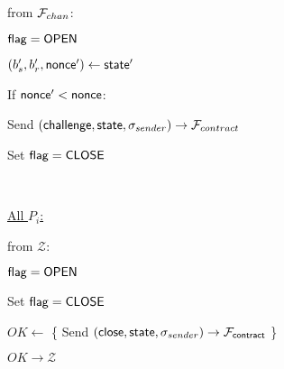 \begin{bbox}[title={$\Pi_{\msf{pay}} (P_s, P_r, b_s, b_r)$}]
\OnInput {} from $\mathcal{F}_{chan}$:
	\begin{renumerate}
		\item \Require ${\mathsf {flag}} = {\mathsf {OPEN}}$
		\item $(b_s', b_r', {\mathsf {nonce}}') \leftarrow {\mathsf {state}}'$
		\item If ${\mathsf {nonce}}' < {\mathsf {nonce}}$:

			\quad Send $({\mathsf {challenge}}, {\mathsf {state}}, \sigma_{sender}) \rightarrow \mathcal{F}_{contract}$

		\item Set ${\mathsf {flag}} = {\mathsf {CLOSE}}$
	\end{renumerate}

\

\underline{All $P_i$:}

\OnInput {} from $\mathcal{Z}$:
	\begin{renumerate}
		\item \Require ${\mathsf {flag}} = {\mathsf {OPEN}}$
		\item Set ${\mathsf {flag}} = {\mathsf {CLOSE}}$
		\item $OK \leftarrow $ \{ Send $({\mathsf {close}}, {\mathsf {state}}, \sigma_{sender}) \rightarrow \mathcal{F}_{{\mathsf {contract}}}$ \}
	\end{renumerate}
	\quad \Send $OK \rightarrow \mathcal{Z}$

\end{bbox}
